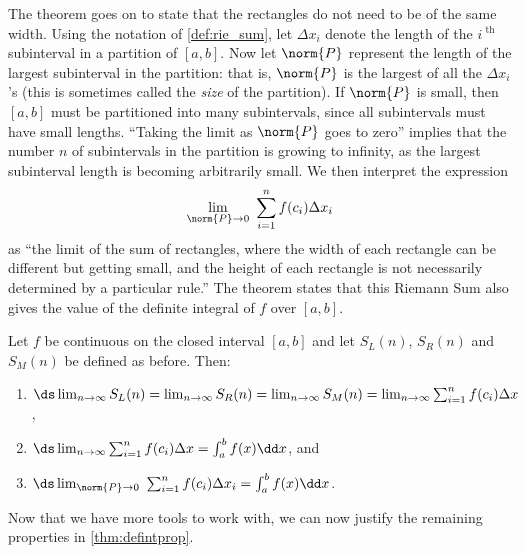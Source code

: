 The theorem goes on to state that the rectangles do not need to be of the same width. Using the notation of \autoref{def:rie_sum}, let $\Delta x_i$ denote the length of the $i^\text{ th}$ subinterval in a partition of $[a,b]$. Now let $\norm{P}$ represent the length of the largest subinterval in the partition: that is, $\norm{P}$ is the largest of all the $\Delta x_i$'s (this is sometimes called the \emph{size} of the partition). If $\norm{P}$ is small, then $[a,b]$ must be partitioned into many subintervals, since all subintervals must have small lengths. ``Taking the limit as $\norm{P}$ goes to zero'' implies that the number $n$ of subintervals in the partition is growing to infinity, as the largest subinterval length is becoming arbitrarily small. We then interpret the expression 
\[\lim_{\norm{P}\to 0}\ \sum_{i=1}^n f(c_i)\Delta x_i\]
as ``the limit of the sum of rectangles, where the width of each rectangle can be different but getting small, and the height of each rectangle is not necessarily determined by a particular rule.'' The theorem states that this Riemann Sum also gives the value of the definite integral of $f$ over $[a,b]$.

{
\begin{theorem}\label{thm:riemannSum}
Let $f$ be continuous on the closed interval $[a,b]$  and let $S_L(n)$, $S_R(n)$ and $S_M(n)$ be defined as before. Then:
\begin{enumerate}
	\item	$\ds \lim_{n\to\infty} S_L(n) = \lim_{n\to\infty} S_R(n) = \lim_{n\to\infty} S_M(n) = \lim_{n\to\infty}\sum_{i=1}^n f(c_i)\Delta x$, 
	\item	$\ds \lim_{n\to\infty}\sum_{i=1}^n f(c_i)\Delta x = \int_a^b f(x)\dd x$, and
	\item	$\ds \lim_{\norm{P}\to 0}\ \sum_{i=1}^n f(c_i)\Delta x_i = \int_a^b f(x)\dd x$.
\end{enumerate}
\end{theorem}}

Now that we have more tools to work with, we can now justify the remaining properties in \autoref{thm:defintprop}. 

%

